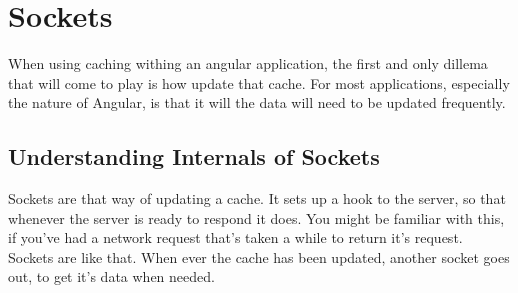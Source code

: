 \maketitle{}
\section{ Sockets }

When using caching withing an angular application, the first and only dillema
that will come to play is how update that cache. For most applications,
especially the nature of Angular, is that it will the data will need to be
updated frequently.

\subsection{ Understanding Internals of Sockets }
Sockets are that way of updating a cache. It sets up a hook
to the server, so that whenever the server is ready to respond it does. You
might be familiar with this, if you've had a network request that's taken a
while to return it's request. Sockets are like that. When ever the cache has
been updated, another socket goes out, to get it's data when needed.

